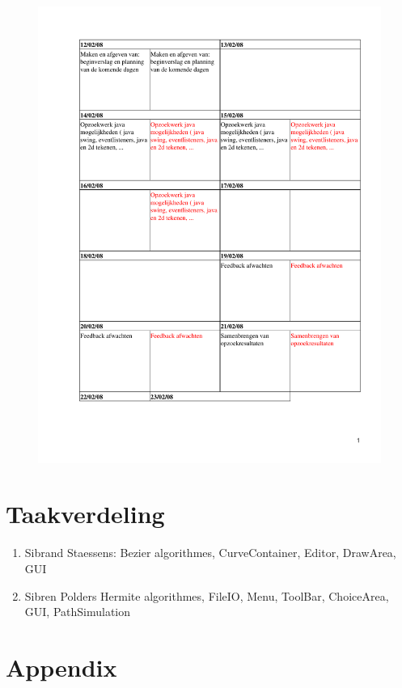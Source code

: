\documentclass[a4paper,11pt,oneside, titlepage]{article}
\begin{document}
\begin{figure}[htbp]
\centering
\includegraphics[scale=0.8, page=9]{./planning.pdf}
\end{figure}
\newpage
\section{Taakverdeling}
\begin{enumerate}
\item Sibrand Staessens:
       Bezier algorithmes, CurveContainer, Editor, DrawArea, GUI
\item Sibren Polders
       Hermite algorithmes, FileIO, Menu, ToolBar, ChoiceArea, GUI, PathSimulation
\end{enumerate}
\newpage
\section{Appendix}
\appendix
\end{document}
